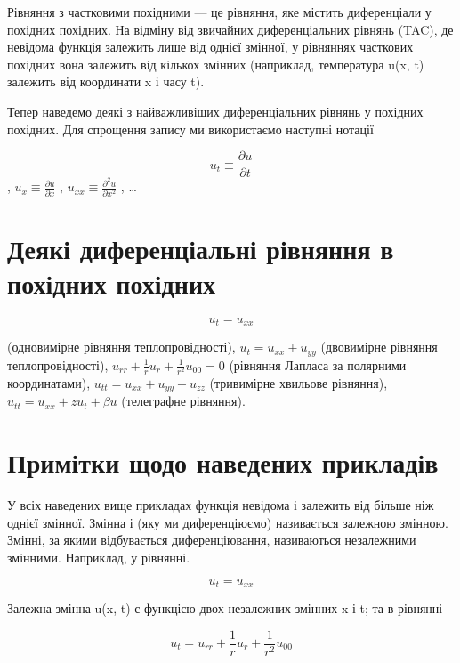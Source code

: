 \documentclass[
  ukrainian,
]{article}
\begin{document}
Рівняння з частковими похідними --- це рівняння, яке містить
диференціали у похідних похідних. На відміну від звичайних
диференціальних рівнянь (TAC), де невідома функція залежить лише від
однієї змінної, у рівняннях часткових похідних вона залежить від кількох
змінних (наприклад, температура u(x, t) залежить від координати x і часу
t).

Тепер наведемо деякі з найважливіших диференціальних рівнянь у похідних
похідних. Для спрощення запису ми використаємо наступні нотації

\[u_t \equiv \frac{\partial u}{\partial t}\],
\(u_x \equiv \frac{\partial u}{\partial x}\) ,
\(u_{xx} \equiv \frac{\partial^2 u}{\partial x^2}\) , \ldots{}

\section{Деякі диференціальні рівняння в похідних
похідних}\label{ux434ux435ux44fux43aux456-ux434ux438ux444ux435ux440ux435ux43dux446ux456ux430ux43bux44cux43dux456-ux440ux456ux432ux43dux44fux43dux43dux44f-ux432-ux43fux43eux445ux456ux434ux43dux438ux445-ux43fux43eux445ux456ux434ux43dux438ux445}

\[u_t = u_{xx}\]

(одновимірне рівняння теплопровідності), \(u_t = u_{xx} + u_{yy}\)
(двовимірне рівняння теплопровідності),
\(u_{rr} + \frac{1}{r}u_r + \frac{1}{r^2}u_{00} = 0\) (рівняння Лапласа
за полярними координатами), \(u_{tt} = u_{xx} + u_{yy} + u_{zz}\)
(тривимірне хвильове рівняння), \(u_{tt} = u_{xx} + zu_t + \beta u\)
(телеграфне рівняння).

\section{Примітки щодо наведених
прикладів}\label{ux43fux440ux438ux43cux456ux442ux43aux438-ux449ux43eux434ux43e-ux43dux430ux432ux435ux434ux435ux43dux438ux445-ux43fux440ux438ux43aux43bux430ux434ux456ux432}

У всіх наведених вище прикладах функція невідома і залежить від більше
ніж однієї змінної. Змінна і (яку ми диференціюємо) називається залежною
змінною. Змінні, за якими відбувається диференціювання, називаються
незалежними змінними. Наприклад, у рівнянні.

\[u_t = u_{xx}\]

Залежна змінна u(x, t) є функцією двох незалежних змінних x і t; та в
рівнянні

\[u_t = u_{rr} + \frac{1}{r} u_r + \frac{1}{r^2} u_{00}\]
\end{document}

